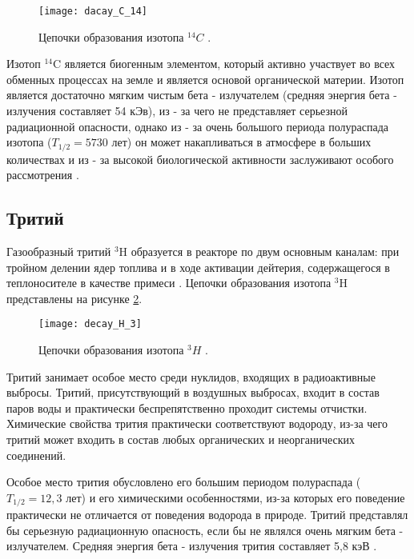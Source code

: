 \begin{figure}[ht!]
    \centering
    \texttt{[image: dacay\_C\_14]}
    \captionsetup{justification=centering}
    \caption{Цепочки образования изотопа $^{14}C$ \cite{periodic_table}.}
    \label{fig_C_14_decay}
\end{figure}

Изотоп $^{14}\text{C}$ является биогенным элементом, который активно участвует во всех обменных процессах на земле и 
является основой органической материи. Изотоп является достаточно мягким чистым бета - излучателем (средняя энергия бета 
- излучения составляет 54 кЭв), из - за чего не представляет серьезной радиационной опасности, однако из - за очень 
большого периода полураспада изотопа ($T_{1/2}=5730$ лет) он может накапливаться в атмосфере в больших количествах и 
из - за высокой биологической активности заслуживают особого рассмотрения \cite{nuc_waste}.

\subsection{Тритий}

Газообразный тритий $^{3}\text{H}$ образуется в реакторе по двум основным каналам: при тройном делении ядер топлива и в 
ходе активации дейтерия, содержащегося в теплоносителе в качестве примеси \cite{bekman_nuclear}. Цепочки образования 
изотопа $^{3}\text{H}$ представлены на рисунке \ref{fig_H_3_decay}.

\begin{figure}[ht!]
    \centering
    \texttt{[image: decay\_H\_3]}
    \captionsetup{justification=centering}
    \caption{Цепочки образования изотопа $^{3}H$ \cite{periodic_table}.}
    \label{fig_H_3_decay}
\end{figure}

Тритий занимает особое место среди нуклидов, входящих в радиоактивные выбросы. Тритий, присутствующий в воздушных 
выбросах, входит в состав паров воды и практически беспрепятственно проходит системы отчистки. Химические свойства 
трития практически соответствуют водороду, из-за чего тритий может входить в состав любых органических и неорганических 
соединений.

Особое место трития обусловлено его большим периодом полураспада ($T_{1/2}=12,3$ лет) и его химическими особенностями, 
из-за которых его поведение практически не отличается от поведения водорода в природе. Тритий представлял бы серьезную 
радиационную опасность, если бы не являлся очень мягким бета - излучателем. Средняя энергия бета - излучения трития 
составляет 5,8 кэВ \cite{nuc_waste}.

